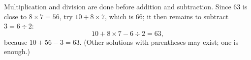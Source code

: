 Multiplication and division are done before addition and subtraction. Since $63$ is close to $8\times7=56$, try $10+8\times7$, which is $66$; it then remains to subtract $3=6\div2$:
\[
\boxed{10+8\times7-6\div2=63},
\]
because $10+56-3=63$. (Other solutions with parentheses may exist; one is enough.)
